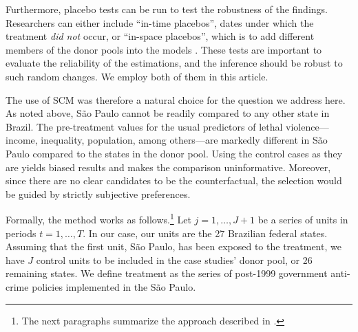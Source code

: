 \documentclass[a4paper,11pt]{article}
\begin{document}
Furthermore, placebo tests can be run to test the robustness of the findings. Researchers can either include ``in-time placebos'', dates under which the treatment \textit{did not} occur, or ``in-space placebos'', which is to add different members of the donor pools into the models \citep{abadie2014}. These tests are important to evaluate the reliability of the estimations, and the inference should be robust to such random changes. We employ both of them in this article.

The use of SCM was therefore a natural choice for the question we address here. As noted above, S\~{a}o Paulo cannot be readily compared to any other state in Brazil. The pre-treatment values for the usual predictors of lethal violence---income, inequality, population, among others---are markedly different in S\~{a}o Paulo compared to the states in the donor pool. Using the control cases as they are yields biased results and makes the comparison uninformative. Moreover, since there are no clear candidates to be the counterfactual, the selection would be guided by strictly subjective preferences.

Formally, the method works as follows.\footnote{The next paragraphs summarize the approach described in \citet{abadie2010}.} Let $j = 1, \dots, J + 1$ be a series of units in periods $t = 1, \dots, T$. In our case, our units are the 27 Brazilian federal states. Assuming that the first unit, S\~{a}o Paulo, has been exposed to the treatment, we have $J$ control units to be included in the case studies' donor pool, or 26 remaining states. We define treatment as the series of post-1999 government anti-crime policies implemented in the S\~{a}o Paulo.
\end{document}
